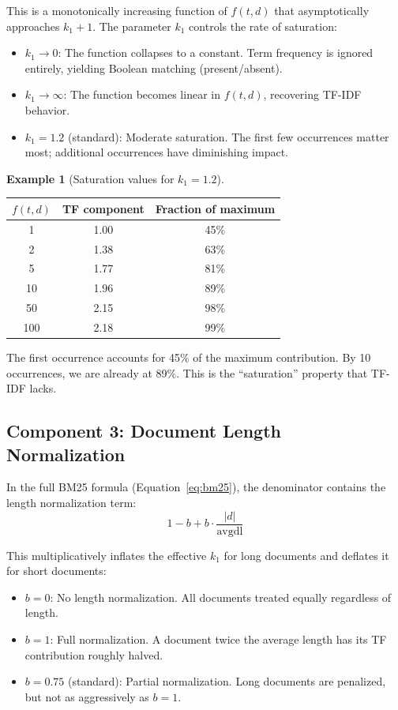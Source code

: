 \documentclass[11pt,a4paper]{article}
\theoremstyle{definition}
\newtheorem{example}{Example}[section]
\theoremstyle{plain}
\begin{document}
This is a monotonically increasing function of $f(t,d)$ that asymptotically approaches $k_1 + 1$. The parameter $k_1$ controls the rate of saturation:

\begin{itemize}
    \item $k_1 \to 0$: The function collapses to a constant. Term frequency is ignored entirely, yielding Boolean matching (present/absent).
    \item $k_1 \to \infty$: The function becomes linear in $f(t,d)$, recovering TF-IDF behavior.
    \item $k_1 = 1.2$ (standard): Moderate saturation. The first few occurrences matter most; additional occurrences have diminishing impact.
\end{itemize}

\begin{example}[Saturation values for $k_1 = 1.2$]
\begin{center}
\begin{tabular}{ccc}
\toprule
$f(t,d)$ & TF component & Fraction of maximum \\
\midrule
1 & 1.00 & 45\% \\
2 & 1.38 & 63\% \\
5 & 1.77 & 81\% \\
10 & 1.96 & 89\% \\
50 & 2.15 & 98\% \\
100 & 2.18 & 99\% \\
\bottomrule
\end{tabular}
\end{center}
The first occurrence accounts for 45\% of the maximum contribution. By 10 occurrences, we are already at 89\%. This is the ``saturation'' property that TF-IDF lacks.
\end{example}

\subsection{Component 3: Document Length Normalization}

In the full BM25 formula (Equation~\ref{eq:bm25}), the denominator contains the length normalization term:
\begin{equation}
1 - b + b \cdot \frac{|d|}{\text{avgdl}}
\label{eq:lengthnorm}
\end{equation}

This multiplicatively inflates the effective $k_1$ for long documents and deflates it for short documents:
\begin{itemize}
    \item $b = 0$: No length normalization. All documents treated equally regardless of length.
    \item $b = 1$: Full normalization. A document twice the average length has its TF contribution roughly halved.
    \item $b = 0.75$ (standard): Partial normalization. Long documents are penalized, but not as aggressively as $b=1$.
\end{itemize}
\end{document}
